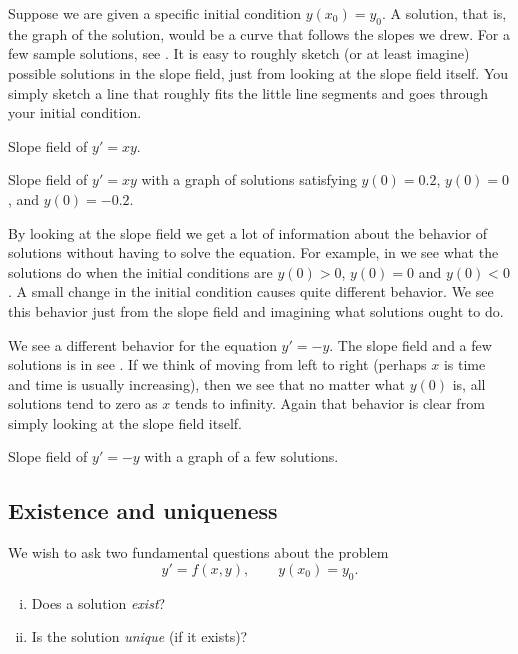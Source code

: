 Suppose we are given a specific initial condition $y(x_0) = y_0$.
A solution, that is, the graph of the solution, would be a curve
that follows the slopes we drew.
For a few sample
solutions, see .  It is easy to roughly sketch
(or at least imagine)
possible solutions in the slope field, just from looking at the slope field
itself.  You simply sketch a line that roughly fits the little line segments
and goes through your initial condition.

\begin{myfig}
\parbox[t]{3.0in}{
 \capstart
 \caption{Slope field of $y' = xy$.\label{1.3:fig1}}
}
\quad
\parbox[t]{3.0in}{
 \capstart
 \caption{Slope field of $y' = xy$ with a graph of solutions satisfying
 $y(0) = 0.2$, $y(0) = 0$, and $y(0) = -0.2$.\label{1.3:fig2}}
}
\end{myfig}

By looking at the slope field we get a lot of information
about the behavior of solutions without having to solve
the equation.  For
example, in  we see what the solutions do when the initial conditions
are $y(0) > 0$, $y(0) = 0$ and $y(0) < 0$.
A small change in the
initial condition causes quite different behavior.
We see this behavior just
from the slope field and imagining what solutions ought to do.

We see a different behavior for the equation
$y' = -y$.  The slope field and a few solutions is in
see .
If we think of moving from left to right (perhaps $x$ is time
and time is usually increasing), then
we see that no matter what $y(0)$ is, all solutions tend to zero as $x$
tends to infinity.
Again that behavior is clear from simply
looking at the slope field itself.

\begin{myfig}
\capstart
{}
\caption{Slope field of $y' = -y$ with a graph of a few solutions.\label{1.3:fig3}}
\end{myfig}

\subsection{Existence and uniqueness}

We wish to ask two fundamental questions about the problem
\begin{equation*}
y' = f(x,y), \qquad y(x_0) = y_0.
\end{equation*}
\begin{enumerate}[(i)]
\item Does a solution \emph{exist}?
\item Is the solution \emph{unique} (if it exists)?
\end{enumerate}

